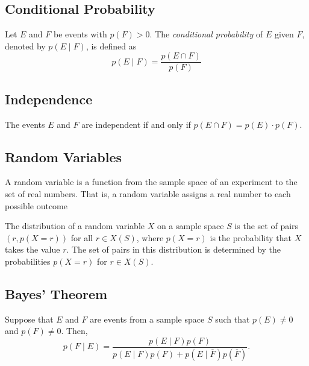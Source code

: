 \documentclass{article}
\begin{document}
\subsection{Conditional Probability}
\begin{definition}
    Let \( E \) and \( F \) be events with \( p(F) > 0 \). The \textit{conditional probability} of \( E \) given \( F \), denoted by \( p(E \mid F) \), is defined as
    \[
    p(E \mid F) = \frac{p(E \cap F)}{p(F)}
    \]
\end{definition}
\subsection{Independence}
\begin{definition}
    The events \(E \) and \(F \) are independent if and only if \(p(E \cap F) = p(E) \cdot p(F)\).
\end{definition}

\subsection{Random Variables}
\begin{definition}
    A random variable is a function from the sample space of an experiment to the set of real numbers. That is, a random variable assigns a real number to each possible outcome
\end{definition}
\begin{definition}
    The distribution of a random variable \(X \) on a sample space \(S \) is the set of pairs \((r, p(X = r))\) for all \(r \in X(S) \), where \(p(X = r)\) is the probability that \(X\) takes the value \(r\).
    The set of pairs in this distribution is determined by the probabilities \(p(X = r)\) for \(r \in X(S)\).
\end{definition}
\subsection{Bayes' Theorem}
\begin{theorem}
    Suppose that \( E \) and \( F \) are events from a sample space \( S \) such that \( p(E) \neq 0 \) and \( p(F) \neq 0 \). Then,
    \[
    p(F \mid E) = \frac{p(E \mid F)p(F)}{p(E \mid F)p(F) + p(E \mid \overline{F})p(\overline{F})}.
    \]
\end{theorem}
\end{document}
